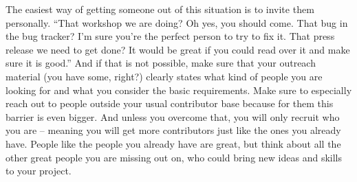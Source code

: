 The easiest way of getting someone out of this situation is to invite them
personally. ``That workshop we are doing? Oh yes, you should come. That bug in
the bug tracker? I'm sure you're the perfect person to try to fix it. That press
release we need to get done? It would be great if you could read over it and
make sure it is good.'' And if that is not possible, make sure that your
outreach material (you have some, right?) clearly states what kind of people you
are looking for and what you consider the basic requirements. Make sure to
especially reach out to people outside your usual contributor base because for
them this barrier is even bigger. And unless you overcome that, you will only
recruit who you are -- meaning you will get more contributors just like the ones
you already have. People like the people you already have are great, but think
about all the other great people you are missing out on, who could bring new
ideas and skills to your project.
